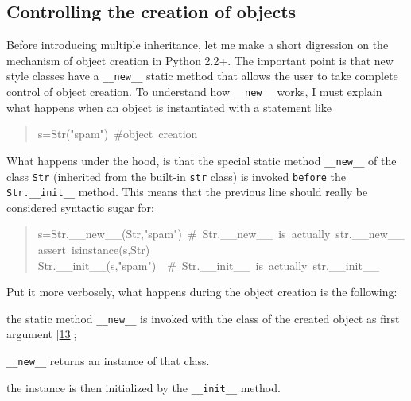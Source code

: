 \documentclass[10pt,english]{article}
\begin{document}

\hypertarget{controlling-the-creation-of-objects}{}
\subsection*{Controlling the creation of objects}

Before introducing multiple inheritance, let me make a short digression on
the mechanism of object creation in Python 2.2+. The important point is
that new style classes have a \texttt{{\_}{\_}new{\_}{\_}} static method that allows
the user to take complete control of object creation. To understand how
\texttt{{\_}{\_}new{\_}{\_}} works, I must explain what happens when an object is instantiated
with a statement like
\begin{quote}
\begin{ttfamily}\begin{flushleft}
\mbox{s=Str("spam")~{\#}object~creation}
\end{flushleft}\end{ttfamily}
\end{quote}

What happens under the hood, is that the special static method  \texttt{{\_}{\_}new{\_}{\_}} 
of the class \texttt{Str} (inherited from the built-in \texttt{str} class)
is invoked \texttt{before} the \texttt{Str.{\_}{\_}init{\_}{\_}} method. This means that
the previous line should really be considered syntactic sugar for:
\begin{quote}
\begin{ttfamily}\begin{flushleft}
\mbox{s=Str.{\_}{\_}new{\_}{\_}(Str,"spam")~{\#}~Str.{\_}{\_}new{\_}{\_}~is~actually~str.{\_}{\_}new{\_}{\_}}\\
\mbox{assert~isinstance(s,Str)}\\
\mbox{Str.{\_}{\_}init{\_}{\_}(s,"spam")~~{\#}~Str.{\_}{\_}init{\_}{\_}~is~actually~str.{\_}{\_}init{\_}{\_}}
\end{flushleft}\end{ttfamily}
\end{quote}

Put it more verbosely, what happens during the object creation is the
following:
\begin{list}{.}
{
\setlength{\rightmargin}{\leftmargin}
}
\item {} 
the static method \texttt{{\_}{\_}new{\_}{\_}}  is invoked with the class of the created 
object as first argument [\hyperlink{id26}{13}];

\item {} 
\texttt{{\_}{\_}new{\_}{\_}} returns an instance of that class.

\item {} 
the instance is then initialized by the \texttt{{\_}{\_}init{\_}{\_}} method.

\end{list}
\end{document}
